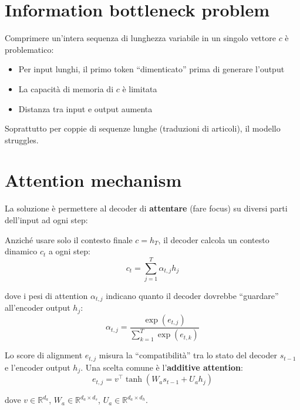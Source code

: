 \section{Information bottleneck problem}

\begin{tcolorbox}[title=Problema del bottleneck]
Comprimere un'intera sequenza di lunghezza variabile in un singolo vettore $c$ è problematico:
\begin{itemize}
\item Per input lunghi, il primo token ``dimenticato'' prima di generare l'output
\item La capacità di memoria di $c$ è limitata
\item Distanza tra input e output aumenta
\end{itemize}

Soprattutto per coppie di sequenze lunghe (traduzioni di articoli), il modello struggles.
\end{tcolorbox}

\section{Attention mechanism}

La soluzione è permettere al decoder di \textbf{attentare} (fare focus) su diversi parti dell'input ad ogni step:

\begin{definition}
Anziché usare solo il contesto finale $c = h_T$, il decoder calcola un contesto dinamico $c_t$ a ogni step:
\[
c_t = \sum_{j=1}^{T} \alpha_{t,j} h_j
\]

dove i pesi di attention $\alpha_{t,j}$ indicano quanto il decoder dovrebbe ``guardare'' all'encoder output $h_j$:
\[
\alpha_{t,j} = \frac{\exp(e_{t,j})}{\sum_{k=1}^{T} \exp(e_{t,k})}
\]

Lo score di alignment $e_{t,j}$ misura la ``compatibilità'' tra lo stato del decoder $s_{t-1}$ e l'encoder output $h_j$. Una scelta comune è l'\textbf{additive attention}:
\[
e_{t,j} = v^\top \tanh(W_a s_{t-1} + U_a h_j)
\]

dove $v \in \mathbb{R}^{d_a}$, $W_a \in \mathbb{R}^{d_a \times d_s}$, $U_a \in \mathbb{R}^{d_a \times d_h}$.
\end{definition}

